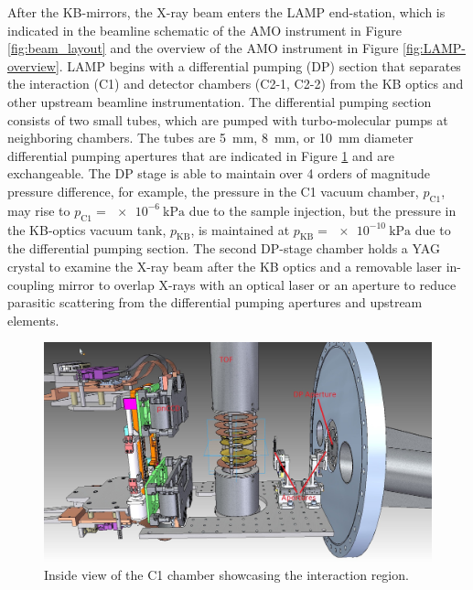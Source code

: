 After the KB-mirrors, the X-ray beam enters the LAMP end-station, which is indicated in the beamline schematic of the AMO instrument in Figure \ref{fig:beam_layout} and the overview of the AMO instrument in Figure \ref{fig:LAMP-overview}. LAMP begins with a differential pumping (DP) section that separates the interaction (C1) and detector chambers (C2-1, C2-2) from the KB optics and other upstream beamline instrumentation. The differential pumping section consists of two small tubes, which are pumped with turbo-molecular pumps at neighboring chambers. The tubes are \SI{5}{\milli\meter}, \SI{8}{\milli\meter}, or \SI{10}{\milli\meter} diameter differential pumping apertures that are indicated in Figure \ref{fig:c1-ccd-spec} and are exchangeable. The DP stage is able to maintain over 4 orders of magnitude pressure difference, for example, the pressure in the C1 vacuum chamber, $p_{\text{C1}}$, may rise to $p_{\text{C1}}=\SI{e-6}{\kilo\pascal}$ due to the sample injection, but the pressure in the KB-optics vacuum tank, $p_{\text{KB}}$, is maintained at $p_{\text{KB}}=\SI{e-10}{\kilo\pascal}$ due to the differential pumping section. The second DP-stage chamber holds a YAG crystal to examine the X-ray beam after the KB optics and a removable laser in-coupling mirror to overlap X-rays with an optical laser or an aperture to reduce parasitic scattering from the differential pumping apertures and upstream elements.\\[1\baselineskip]
\begin{figure}
	\centering
		\includegraphics[width=1.00\textwidth]{images/c1-ccd-spec.jpg}
	\caption{Inside view of the C1 chamber showcasing the interaction region.}
	\label{fig:c1-ccd-spec}
\end{figure}
%

